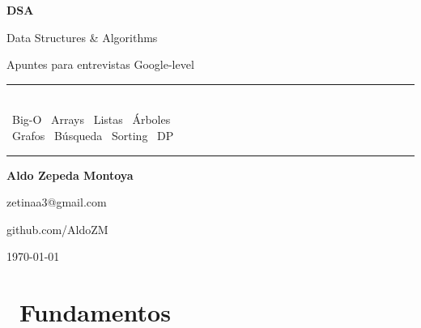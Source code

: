 \documentclass[12pt, a4paper, openany]{book}
\begin{document}
\begin{titlepage}
  \pagecolor{fondogris}
  \color{white}
  \centering
  \vspace*{2cm}
  {\fontsize{48}{56}\selectfont\bfseries\color{n-cyan} DSA\par}
  \vspace{0.5em}
  {\fontsize{18}{24}\selectfont\color{n-lime} Data Structures \& Algorithms\par}
  \vspace{0.5em}
  {\large\color{grisclaro} Apuntes para entrevistas Google-level\par}
  \vspace{3cm}
  \begin{center}
    \color{n-yellow}
    \rule{0.6\textwidth}{1pt}\\[0.5em]
    {\normalsize\color{white}
      ~Big-O \quad
      ~Arrays \quad
      ~Listas \quad
      ~Árboles\\[0.4em]
      ~Grafos \quad
      ~Búsqueda \quad
      ~Sorting \quad
      ~DP
    }\\[0.5em]
    \color{n-yellow}\rule{0.6\textwidth}{1pt}
  \end{center}
  \vspace{3cm}
  {\large\bfseries\color{white} Aldo Zepeda Montoya\par}
  \vspace{0.5em}
  {\normalsize\color{grisclaro} zetinaa3@gmail.com\par}
  \vspace{0.5em}
  {\normalsize\color{grisclaro} github.com/AldoZM\par}
  \vfill
  {\normalsize\color{n-cyan} \today\par}
\end{titlepage}

\tableofcontents
\newpage

\part{~Fundamentos}



\end{document}
